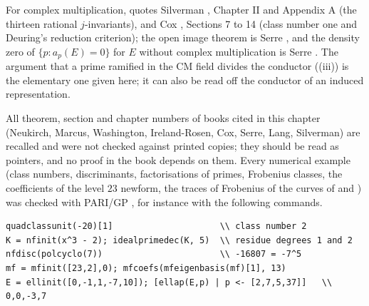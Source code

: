 For complex multiplication,  quotes Silverman \cite{SilvermanATAEC}, Chapter II and Appendix A (the thirteen rational $j$-invariants), and
Cox \cite{Cox}, Sections 7 to 14 (class number one and Deuring's reduction criterion); the open image theorem is Serre \cite{Serre72}, and the density zero of
$\{p:a_p(E)=0\}$ for $E$ without complex multiplication is Serre \cite{Serre81}. The argument that a prime ramified in the CM field divides the conductor
((iii)) is the elementary one given here; it can also be read off the conductor of an induced representation.

All theorem, section and chapter numbers of books cited in this chapter (Neukirch, Marcus, Washington, Ireland-Rosen, Cox, Serre, Lang, Silverman) are recalled
and were not checked against printed copies; they should be read as pointers, and no proof in the book depends on them. Every numerical example (class
numbers, discriminants, factorisations of primes, Frobenius classes, the coefficients of the level $23$ newform, the traces of Frobenius of the curves of
 and ) was checked with PARI/GP \cite{PARI}, for instance with the following commands.
\begin{lstlisting}[language=GP]
quadclassunit(-20)[1]                     \\ class number 2
K = nfinit(x^3 - 2); idealprimedec(K, 5)  \\ residue degrees 1 and 2
nfdisc(polcyclo(7))                       \\ -16807 = -7^5
mf = mfinit([23,2],0); mfcoefs(mfeigenbasis(mf)[1], 13)
E = ellinit([0,-1,1,-7,10]); [ellap(E,p) | p <- [2,7,5,37]]   \\ 0,0,-3,7
\end{lstlisting}
